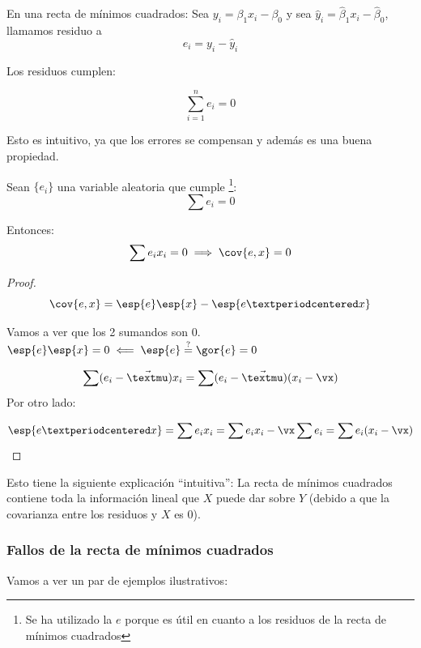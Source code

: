 \begin{itemize}
\begin{prop}
\begin{enumerate}
		\end{enumerate}

	\end{prop}


\begin{defn}[Residuo]
En una recta de mínimos cuadrados: Sea $y_i = β_1x_i - β_0$ y sea $\hat{y}_i = \hat{β}_1x_i - \hat{β}_0$, llamamos residuo a $$e_i = y_i - \hat{y}_i$$

Los residuos cumplen:

\[
\sum_{i=1}^n e_i = 0
\]

Esto es intuitivo, ya que los errores se compensan y además es una buena propiedad.
\end{defn}



\begin{prop}
Sean $\{e_i\}$ una variable aleatoria que cumple \footnote{Se ha utilizado la $e$ porque es útil en cuanto a los residuos de la recta de mínimos cuadrados}:
\[\sum e_i = 0\]

Entonces:
\[\sum e_i x_i = 0 \implies \cov{e,x} = 0\]
\end{prop}

\begin{proof}
\[
\cov{e,x} = \esp{e}\esp{x} - \esp{e·x}
\]

Vamos a ver que los 2 sumandos son 0. $\esp{e}\esp{x} = 0 \impliedby \esp{e} \overset{?}{=} \gor{e} = 0$ 

\[ \sum (e_i - \vec{µ}) x_i = \sum (e_i - \vec{µ}) (x_i - \vx) \]
Por otro lado:

\[
\esp{e·x} = \sum e_ix_i = \sum e_ix_i - \vx \sum e_i = \sum e_i(x_i - \vx)
\]
\end{proof}


Esto tiene la siguiente explicación ``intuitiva'': La recta de mínimos cuadrados contiene toda la información lineal que $X$ puede dar sobre $Y$ (debido a que la covarianza entre los residuos y $X$ es 0).

\subsubsection{Fallos de la recta de mínimos cuadrados}

Vamos a ver un par de ejemplos ilustrativos:

\begin{example}


\end{example}
\end{itemize}
